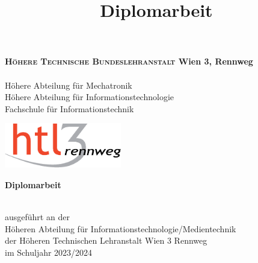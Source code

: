 \documentclass[
    headings=optiontotocandhead,%
    twoside,
    numbers=noenddot,%
    toc=flat, %
    12pt, %
    titlepage, %
    parskip=full, %
    listof=totoc, %
    listof=flat, %
    numbers=noenddot, %
    bibliography=totoc, %
    a4paper,DIV=14,
    BCOR=15mm,
]{scrbook}
\begin{document}
\newcommand{\kapitelautor}{}




\frontmatter %
\title{Diplomarbeit}

\begin{titlepage}
\begin{minipage}[b]{1\columnwidth}
\parbox[b]{99mm}{
\begin{TitlePageBox}
\footnotesize%
\textsf{%
\textbf{\textsc{Höhere Technische Bundeslehranstalt} Wien 3, Rennweg}\\
\\
Höhere Abteilung für Mechatronik\\
Höhere Abteilung für Informationstechnologie\\
Fachschule für Informationstechnik}
\end{TitlePageBox}
}\hfill\parbox[b]{50mm}{\includegraphics[width=51mm]{HTL3RLogoRGB}}
\mbox{}
\end{minipage}

\vspace{1cm}


\begin{center}

\textbf{\LARGE{}Diplomarbeit}{\large{}}\\ %
{\large{}\vspace{15mm}
 }
\textbf{\large{}\FF}\\

 \vfill

 ausgeführt an der\\
 Höheren Abteilung für Informationstechnologie/Medientechnik\\
 der Höheren Technischen Lehranstalt Wien 3 Rennweg\\

 \vfill
 im Schuljahr 2023/2024\\

\vspace{1cm}


\end{center}
\end{titlepage}
\end{document}
